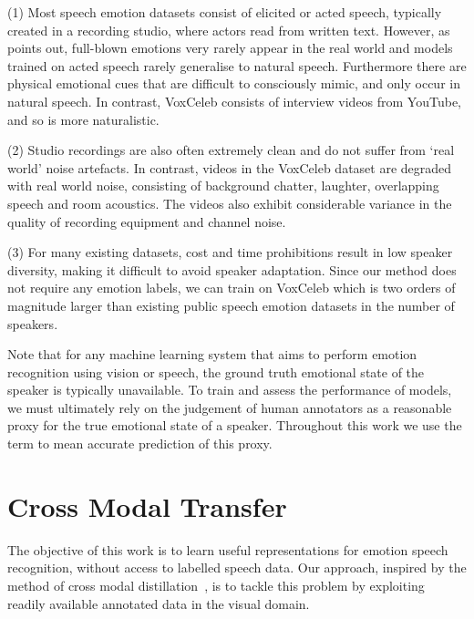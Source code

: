 \documentclass[sigconf]{acmart}
\begin{document}
\vspace{1mm}
\noindent (1) 
Most speech emotion datasets consist of elicited or acted speech, typically created in a recording studio, where actors read from written text. However, as~\cite{douglas2000new} points out, full-blown emotions very rarely appear in the real world and models trained on
acted speech rarely generalise to natural speech. Furthermore there
are physical emotional cues that are difficult to consciously mimic,
and only occur in natural speech. In contrast,  VoxCeleb
consists of interview videos from  YouTube, and so is more naturalistic.

\vspace{1mm}
\noindent (2) Studio recordings are also often extremely clean and do not suffer from `real world' noise artefacts. In contrast, videos in the VoxCeleb dataset are degraded with real world noise, consisting of background chatter, laughter, overlapping speech and room acoustics.  The videos also exhibit considerable variance in the quality of recording equipment and channel noise. 

\vspace{1mm}
\noindent (3)  For many existing datasets, cost and time prohibitions result in low speaker diversity, making it difficult to avoid speaker adaptation. Since our method does not require any emotion labels, we can train on VoxCeleb which is two orders of magnitude larger than existing public speech emotion datasets in the number of speakers.
\vspace{1mm}

Note that for any machine learning system that aims to perform emotion recognition using vision or speech, the ground truth emotional state of the speaker is typically unavailable.  To train and assess the performance of models, we must ultimately rely on the judgement of human annotators as a reasonable proxy for the true emotional state of a speaker.  Throughout this work we use the term  to mean accurate prediction of this proxy. 
 \section{Cross Modal Transfer}\label{sec:distillation}

The objective of this work is to learn useful representations for emotion speech recognition, without access to labelled speech data. Our approach, inspired by the method of cross modal distillation~\cite{gupta2016cross}, is to tackle this problem by exploiting readily available annotated data in the visual domain.
\end{document}
